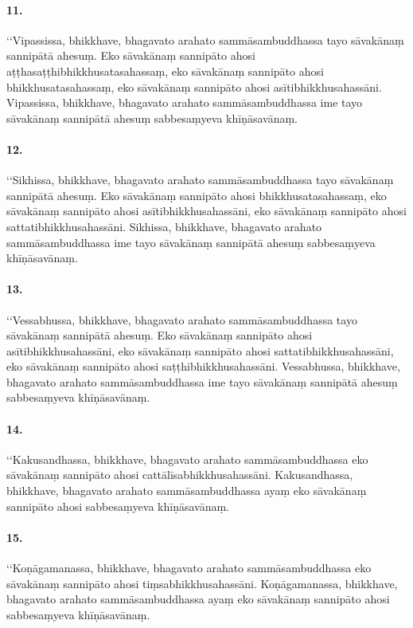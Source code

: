\paragraph{11.} ‘‘Vipassissa, bhikkhave, bhagavato arahato sammāsambuddhassa tayo sāvakānaṃ sannipātā ahesuṃ. Eko sāvakānaṃ sannipāto ahosi aṭṭhasaṭṭhibhikkhusatasahassaṃ, eko sāvakānaṃ sannipāto ahosi bhikkhusatasahassaṃ, eko sāvakānaṃ sannipāto ahosi asītibhikkhusahassāni. Vipassissa, bhikkhave, bhagavato arahato sammāsambuddhassa ime tayo sāvakānaṃ sannipātā ahesuṃ sabbesaṃyeva khīṇāsavānaṃ.

\paragraph{12.} ‘‘Sikhissa, bhikkhave, bhagavato arahato sammāsambuddhassa tayo sāvakānaṃ sannipātā ahesuṃ. Eko sāvakānaṃ sannipāto ahosi bhikkhusatasahassaṃ, eko sāvakānaṃ sannipāto ahosi asītibhikkhusahassāni, eko sāvakānaṃ sannipāto ahosi sattatibhikkhusahassāni. Sikhissa, bhikkhave, bhagavato arahato sammāsambuddhassa ime tayo sāvakānaṃ sannipātā ahesuṃ sabbesaṃyeva khīṇāsavānaṃ.

\paragraph{13.} ‘‘Vessabhussa, bhikkhave, bhagavato arahato sammāsambuddhassa tayo sāvakānaṃ sannipātā ahesuṃ. Eko sāvakānaṃ sannipāto ahosi asītibhikkhusahassāni, eko sāvakānaṃ sannipāto ahosi sattatibhikkhusahassāni, eko sāvakānaṃ sannipāto ahosi saṭṭhibhikkhusahassāni. Vessabhussa, bhikkhave, bhagavato arahato sammāsambuddhassa ime tayo sāvakānaṃ sannipātā ahesuṃ sabbesaṃyeva khīṇāsavānaṃ.

\paragraph{14.} ‘‘Kakusandhassa, bhikkhave, bhagavato arahato sammāsambuddhassa eko sāvakānaṃ sannipāto ahosi cattālīsabhikkhusahassāni. Kakusandhassa, bhikkhave, bhagavato arahato sammāsambuddhassa ayaṃ eko sāvakānaṃ sannipāto ahosi sabbesaṃyeva khīṇāsavānaṃ.

\paragraph{15.} ‘‘Koṇāgamanassa, bhikkhave, bhagavato arahato sammāsambuddhassa eko sāvakānaṃ sannipāto ahosi tiṃsabhikkhusahassāni. Koṇāgamanassa, bhikkhave, bhagavato arahato sammāsambuddhassa ayaṃ eko sāvakānaṃ sannipāto ahosi sabbesaṃyeva khīṇāsavānaṃ.

